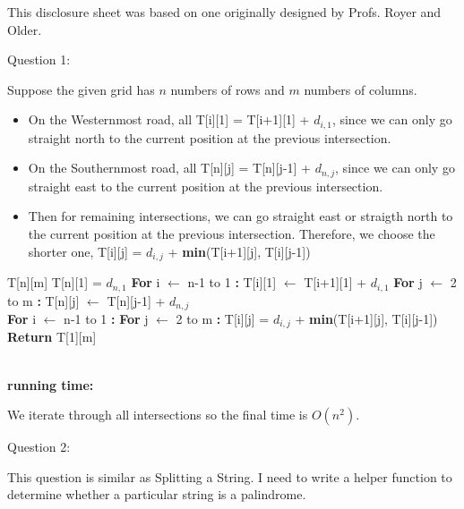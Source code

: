 \documentclass[12pt]{article}
\begin{document}

\hfill {\tiny This disclosure sheet was based on one originally designed
  by
  Profs. Royer and Older.}


\pagebreak
\noindent
\large Question 1: \vspace{5mm} \par
\normalsize 
Suppose the given grid has $n$ numbers of rows and $m$ numbers of columns. 
\begin{itemize}
  \item On the Westernmost road, all T[i][1] = T[i+1][1] + $d_{i,1}$, 
	since we can only go straight north to the current position at the previous intersection.
  \item	On the Southernmost road, all T[n][j] = T[n][j-1] + $d_{n,j}$,
	since we can only go straight east to the current position at the previous intersection.
  \item Then for remaining intersections, we can go straight east or straigth north to the current position at the previous intersection.
	Therefore, we choose the shorter one, T[i][j] = $d_{i,j}$ + \textbf{min}(T[i+1][j], T[i][j-1])
\end{itemize}

\begin{algorithm}
\begin{algorithmic}
\State T[n][m]
\State T[n][1] = $d_{n,1}$
\State \textbf{For} i $\leftarrow$ n-1 to 1 \textbf{:}
\State \hspace{0.4cm} T[i][1] $\leftarrow$ T[i+1][1] + $d_{i,1}$
\State \textbf{For} j $\leftarrow$ 2 to m \textbf{:}
\State \hspace{0.4cm} T[n][j] $\leftarrow$ T[n][j-1] + $d_{n,j}$
\\
\State \textbf{For} i $\leftarrow$ n-1 to 1 \textbf{:}
\State \hspace{0.4cm} \textbf{For} j $\leftarrow$ 2 to m \textbf{:}
\State \hspace{0.8cm} T[i][j] = $d_{i,j}$ + \textbf{min}(T[i+1][j], T[i][j-1])
\\
\State \textbf{Return} T[1][m] 
\end{algorithmic}
\end{algorithm}
\noindent \\
\textbf{running time:} \par
We iterate through all intersections so the final time is $O(n^2)$.



\pagebreak
\noindent
\large Question 2: \vspace{5mm} \par
\normalsize 
This question is similar as Splitting a String.
I need to write a helper function to determine whether a particular string is a palindrome.
\end{document}
